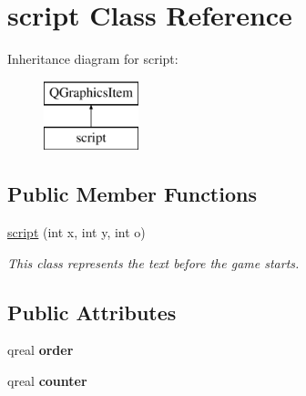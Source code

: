 \hypertarget{classscript}{\section{script Class Reference}
\label{classscript}
}
Inheritance diagram for script\-:\begin{figure}[H]
\begin{center}
\leavevmode
\includegraphics[height=2.000000cm]{classscript}
\end{center}
\end{figure}
\subsection*{Public Member Functions}
\begin{DoxyCompactItemize}
\item 
\hyperlink{classscript_aa086f1b44018c0317df0bcd6a3d09e4e}{script} (int x, int y, int o)
\begin{DoxyCompactList}\small\item\em This class represents the text before the game starts. \end{DoxyCompactList}\end{DoxyCompactItemize}
\subsection*{Public Attributes}
\begin{DoxyCompactItemize}
\item 
\hypertarget{classscript_a831f3571933acedf6b0bc9e4759a3c1d}{qreal {\bfseries order}}\label{classscript_a831f3571933acedf6b0bc9e4759a3c1d}

\item 
\hypertarget{classscript_a04e0af34c71aebcb4f37c743c4a597e0}{qreal {\bfseries counter}}\label{classscript_a04e0af34c71aebcb4f37c743c4a597e0}

\end{DoxyCompactItemize}

